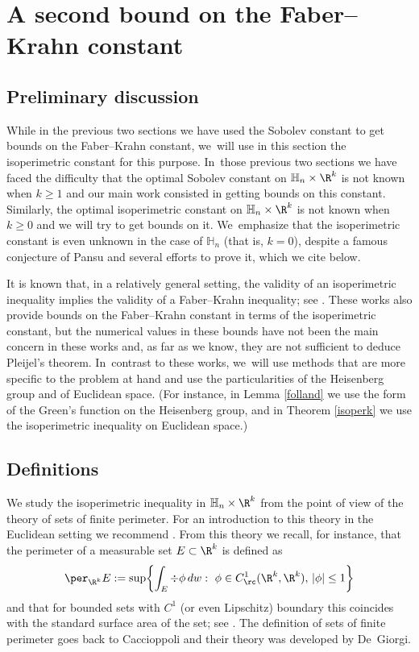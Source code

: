 \section{A second bound on the Faber--Krahn constant}\label{sec:isoperimetric}

\subsection{Preliminary discussion}
While in the previous two sections we have used the Sobolev constant to get bounds on the Faber--Krahn constant, we~will use in this section the isoperimetric constant for this purpose. In~those previous two sections we have faced the difficulty that the optimal Sobolev constant on $\mathbb H_n\times\R^k$ is not known when $k\geq 1$ and our main work consisted in getting bounds on this constant. Similarly, the optimal isoperimetric constant on $\mathbb H_n\times\R^k$ is not known when $k\geq 0$ and we will try to get bounds on it. We~emphasize that the isoperimetric constant is even unknown in the case of $\mathbb H_n$ (that is, $k=0$), despite a famous conjecture of Pansu \cite{Pa2} and several efforts to prove it, which we cite below.

It is known that, in a relatively general setting, the validity of an isoperimetric inequality implies the validity of a Faber--Krahn inequality; see \cite{Car,BaCoLeSC,Va}. These works also provide bounds on the Faber--Krahn constant in terms of the isoperimetric constant, but the numerical values in these bounds have not been the main concern in these works and, as far as we know, they are not sufficient to deduce Pleijel's theorem. In~contrast to these works, we~will use methods that are more specific to the problem at hand and use the particularities of the Heisenberg group and of Euclidean space. (For instance, in Lemma \ref{folland} we use the form of the Green's function on the Heisenberg group, and in Theorem \ref{isoperk} we use the isoperimetric inequality on Euclidean space.)

\subsection{Definitions}
We study the isoperimetric inequality in $\mathbb H_n\times\R^k$ from the point of view of the theory of sets of finite perimeter. For an introduction to this theory in the Euclidean setting we recommend \cite{Ma}. From this theory we recall, for instance, that the perimeter of a measurable set $E\subset\R^k$ is defined as
\[
\per_{\R^k} E := \sup \biggl\{ \int_E \div \phi \,dw :\ \phi\in C^1_\rc(\R^k,\R^k),\,|\phi|\leq 1\biggr\}
\]
and that for bounded sets with $C^1$ (or even Lipschitz) boundary this coincides with the standard surface area of the set; see \cite[Ex.\,12.5 \& 12.6]{Ma}. The definition of sets of finite perimeter goes back to Caccioppoli and their theory was developed by De~Giorgi.

